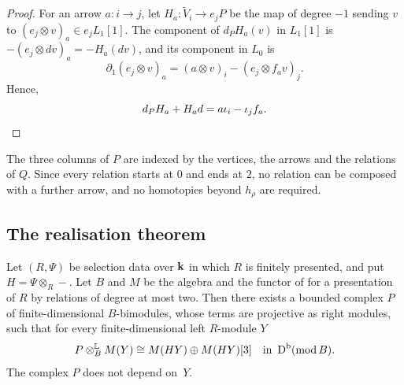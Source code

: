 \begin{proof}
  For an arrow ${a\colon i\to j}$, let ${H_a\colon\widetilde{V}_i\to e_jP}$ be the
  map of degree ${-1}$ sending $v$ to ${(e_j\otimes v)_a\in e_jL_1[1]}$. The
  component of $d_PH_a(v)$ in $L_1[1]$ is ${-(e_j\otimes dv)_a=-H_a(dv)}$, and its
  component in $L_0$ is
  \[
    \partial_1(e_j\otimes v)_a=(a\otimes v)_i-(e_j\otimes f_av)_j.
  \]
  Hence,
  \[
    d_PH_a+H_ad=a\iota_i-\iota_jf_a.\qedhere
  \]
\end{proof}

The three columns of $P$ are indexed by the vertices, the arrows and the
relations of $Q$. Since every relation starts at $0$ and ends at $2$, no
relation can be composed with a further arrow, and no homotopies beyond $h_\rho$
are required.

\subsection{The realisation theorem}
\label{subsec:realisation-theorem}

\begin{theorem}
  \label{thm:realisation}
  Let $(R,\Psi)$ be selection data over $\mathbf{k}$ in which $R$ is finitely
  presented, and put ${H=\Psi\otimes_R-}$. Let $B$ and $M$ be the algebra
  and the functor of  for a presentation of $R$ by
  relations of degree at most two. Then there exists a bounded complex $P$ of
  finite-dimensional $B$-bimodules, whose terms are projective as right
  modules, such that for every finite-dimensional left $R$-module $Y$
  \begin{equation}
    \label{eq:realisation}
    P\Lotimes[B]M(Y)\cong M(HY)\oplus M(HY)[3]\quad\text{in }
    \DerCat[b]{\operatorname{mod}B}.
  \end{equation}
  The complex $P$ does not depend on~$Y$.
\end{theorem}

